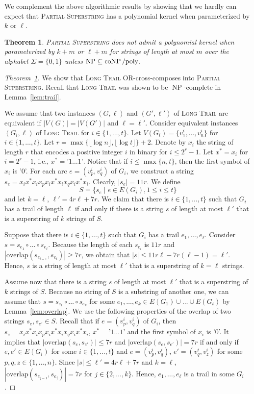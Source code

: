 \documentclass[11pt]{article}
\newtheorem{theorem}{Theorem}
\newcommand{\overlap}{\textrm{overlap}}
\DeclareMathOperator{\operatorClassNP}{NP}
\newcommand{\classNP}{\ensuremath{\operatorClassNP}}
\DeclareMathOperator{\operatorClassCoNP}{coNP}
\newcommand{\classCoNP}{\ensuremath{\operatorClassCoNP}}
\begin{document}
We complement the above algorithmic results by showing that we hardly can expect that \textsc{Partial Superstring} has a polynomial kernel when parameterized by $k$ or $\ell$. 
\begin{theorem}\label{thm:no-kernel}
\textsc{Partial Superstring} does not admit a  polynomial kernel when parameterized by $k+m$ or $\ell+m$ for strings of length at most $m$ over the alphabet $\Sigma=\{0,1\}$ unless $\classNP\subseteq\classCoNP/\text{\rm poly}$.
\end{theorem}

 \begin{proof}[Theorem~\ref{thm:no-kernel}]
We show that \textsc{Long Trail} OR-cross-composes into \textsc{Partial Superstring}. Recall that \textsc{Long Trail} was shown to be \classNP-complete in Lemma~\ref{lem:trail}.

We assume that two instances $(G,\ell)$ and $(G',\ell')$ of  \textsc{Long Trail} are equivalent if $|V(G)|=|V(G')|$ and $\ell=\ell'$.
Consider equivalent instances $(G_i,\ell)$ of   \textsc{Long Trail} for $i\in\{1,\ldots,t\}$. Let $V(G_i)=\{v_1^i,\ldots,v_n^i\}$ for $i\in\{1,\ldots,t\}$. 
Let $r=\max\{\lfloor \log n\rfloor,\lfloor \log t\rfloor\}+2$. Denote by $x_i$ the string of length $r$ that encodes a positive integer $i$ in binary for $i\leq 2^{r}-1$.  
Let $x^*=x_i$ for $i=2^r-1$, i.e., $x^*=\text{'}1\ldots1\text{'}$. Notice that if $i\leq \max\{n,t\}$, then the first symbol of $x_i$ is '0'. 
For each arc $e=(v^i_p,v^i_q)$ of $G_i$, we construct a string $s_e=x_ix^*x_ix_px_ix^*x_ix_qx_ix^*x_i$. 
Clearly, $|s_e|=11r$.
We define
$$S=\{s_e\mid e\in E(G_i),1\leq i\leq t\}$$ and let $k=\ell$, $\ell'=4r\ell+7r$. 
We claim that there is $i\in\{1,\ldots,t\}$ such that $G_i$ has a trail of length $\ell$ if and only if there is a string $s$ of length at most $\ell'$ that is a superstring of $k$ strings of $S$.

Suppose that  there is $i\in\{1,\ldots,t\}$ such that $G_i$ has a  trail  $e_1,\ldots,e_{\ell}$.  Consider $s=s_{e_1}\circ\ldots\circ s_{e_\ell}$. Because the length of each $s_{e_i}$ is $11r$ and $|\overlap(s_{e_{i-1}},s_{e_i})|\geq 7r$, we obtain that $|s|\leq 11r\ell-7r(\ell-1)=\ell'$. Hence, $s$ is a string of length at most $\ell'$ that is a superstring of $k=\ell$ strings.

Assume now that there is a string $s$ of length at most $\ell'$ that is a superstring of $k$ strings of $S$. Because no string of $S$ is a substring of another one, we can assume that 
$s=s_{e_1}\circ\ldots\circ s_{e_k}$ for some $e_1,\ldots,e_k\in E(G_1)\cup\ldots\cup E(G_t)$ by Lemma~\ref{lem:overlap}.  
We use the following properties of the overlap of two strings $s_e,s_{e'}\in S$. Recall that if $e=(v^i_p,v^i_q)$ of $G_i$, then $s_e=x_ix^*x_ix_px_ix^*x_ix_qx_ix^*x_i$, $x^*=\text{'}1\ldots1\text{'}$ and 
the first symbol of $x_i$ is '$0$'. It implies that $|\overlap(s_e,s_{e'})|\leq 7r$ and  $|\overlap(s_e,s_{e'})|= 7r$ if and only if $e,e'\in E(G_i)$ for some $i\in\{1,\ldots,t\}$
and $e=(v^i_p,v_q^i)$, $e'=(v^i_q,v^i_z)$ for some $p,q,z\in\{1,\ldots,n\}$. Since $|s|\leq \ell'=4r\ell+7r$ and $k=\ell$, $|\overlap(s_{e_{j-1}},s_{e_j})|=7r$ for $j\in\{2,\ldots,k\}$.
Hence, $e_1,\ldots,e_\ell$  is a  trail in some $G_i$.


\end{proof}
\end{document}
